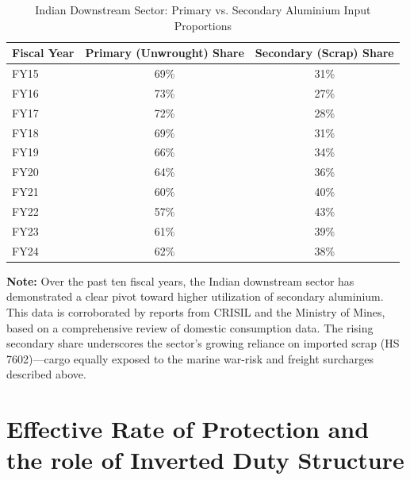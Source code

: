 \documentclass[11pt, a4paper]{article}
\numberwithin{figure}{section}
\numberwithin{table}{section}
\begin{document}
\begin{table}[H]
    \centering
    \caption{Indian Downstream Sector: Primary vs. Secondary Aluminium Input Proportions}
    \label{tab:aluminium_shares}
    \begin{tabular}{lcc}
        \toprule
        \textbf{Fiscal Year} & \textbf{Primary (Unwrought) Share} & \textbf{Secondary (Scrap) Share} \\
        \midrule
        FY15 & 69\% & 31\% \\
        FY16 & 73\% & 27\% \\
        FY17 & 72\% & 28\% \\
        FY18 & 69\% & 31\% \\
        FY19 & 66\% & 34\% \\
        FY20 & 64\% & 36\% \\
        FY21 & 60\% & 40\% \\
        FY22 & 57\% & 43\% \\
        FY23 & 61\% & 39\% \\
        FY24 & 62\% & 38\% \\
        \bottomrule
    \end{tabular}
    \vspace{0.5cm}

    \raggedright
    \small \textbf{Note:} Over the past ten fiscal years, the Indian downstream sector has demonstrated a clear pivot toward higher utilization of secondary aluminium. This data is corroborated by reports from CRISIL and the Ministry of Mines, based on a comprehensive review of domestic consumption data. The rising secondary share underscores the sector's growing reliance on imported scrap (HS 7602)—cargo equally exposed to the marine war-risk and freight surcharges described above.
\end{table}

\section{Effective Rate of Protection and the role of Inverted Duty Structure}
\label{sec:erp}
\end{document}
